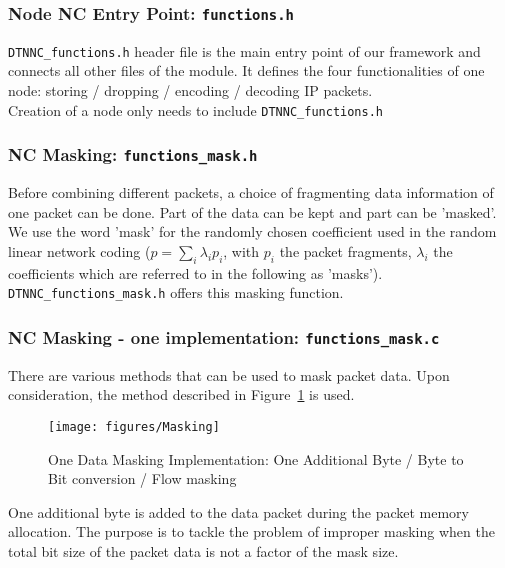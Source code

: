\documentclass[a4paper,twoside]{article}
\begin{document}
\subsubsection{Node NC Entry Point: \texttt{functions.h}}

\texttt{DTNNC\_functions.h} header file is the main entry point of our framework and connects all other files of the module. It defines the four functionalities of one node: storing / dropping / encoding / decoding IP packets. \\

\noindent Creation of a node only needs to include \texttt{DTNNC\_functions.h}



\subsubsection{NC Masking: \texttt{functions\_mask.h}}

Before combining different packets, a choice of fragmenting data information of one packet can be done. Part of the data can be kept and part can be 'masked'. We use the word 'mask' for the randomly chosen coefficient used in the random linear network coding ($p = \sum_i \lambda_i p_i$, with $p_i$ the packet fragments, $\lambda_i$ the coefficients which are referred to in the following as 'masks'). \texttt{DTNNC\_functions\_mask.h} offers this masking function.



\subsubsection{NC Masking - one implementation: \texttt{functions\_mask.c}}

There are various methods that can be used to mask packet data. Upon consideration, the method described in Figure~\ref{fig:masking} is used.

\begin{figure}[!hbt]
\centering
\texttt{[image: figures/Masking]}
\caption{One Data Masking Implementation: One Additional Byte / Byte to Bit conversion / Flow masking}
\label{fig:masking}
\end{figure}

One additional byte is added to the data packet during the packet memory allocation. The purpose is to tackle the problem of improper masking when the total bit size of the packet data is not a factor of the mask size. 
\end{document}
